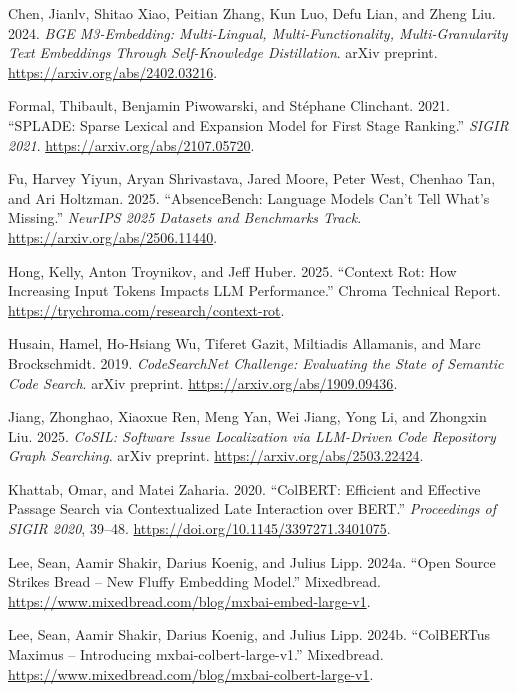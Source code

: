 \documentclass[
  11pt,
  letterpaper,
  numbers=noendperiod,
  parskip=half]{scrartcl}
\newlength{\cslhangindent}
\newenvironment{CSLReferences}[2] %
 {\begin{list}{}{%
  \setlength{\itemindent}{0pt}
  \setlength{\leftmargin}{0pt}
  \setlength{\parsep}{0pt}
  \ifodd #1
   \setlength{\leftmargin}{\cslhangindent}
   \setlength{\itemindent}{-1\cslhangindent}
  \fi
  \setlength{\itemsep}{#2\baselineskip}}}
 {\end{list}}
\begin{document}
\begin{CSLReferences}{1}{1}
Chen, Jianlv, Shitao Xiao, Peitian Zhang, Kun Luo, Defu Lian, and Zheng
Liu. 2024. \emph{{BGE M3}-Embedding: Multi-Lingual,
Multi-Functionality, Multi-Granularity Text Embeddings Through
Self-Knowledge Distillation}. arXiv preprint.
\url{https://arxiv.org/abs/2402.03216}.

Formal, Thibault, Benjamin Piwowarski, and Stéphane Clinchant. 2021.
{``{SPLADE}: Sparse Lexical and Expansion Model for First Stage
Ranking.''} \emph{SIGIR 2021}. \url{https://arxiv.org/abs/2107.05720}.

Fu, Harvey Yiyun, Aryan Shrivastava, Jared Moore, Peter West, Chenhao
Tan, and Ari Holtzman. 2025. {``AbsenceBench: Language Models Can't Tell
What's Missing.''} \emph{NeurIPS 2025 Datasets and Benchmarks Track}.
\url{https://arxiv.org/abs/2506.11440}.

Hong, Kelly, Anton Troynikov, and Jeff Huber. 2025. {``Context Rot: How
Increasing Input Tokens Impacts LLM Performance.''} Chroma Technical
Report. \url{https://trychroma.com/research/context-rot}.

Husain, Hamel, Ho-Hsiang Wu, Tiferet Gazit, Miltiadis Allamanis, and
Marc Brockschmidt. 2019. \emph{CodeSearchNet Challenge: Evaluating the
State of Semantic Code Search}. arXiv preprint.
\url{https://arxiv.org/abs/1909.09436}.

Jiang, Zhonghao, Xiaoxue Ren, Meng Yan, Wei Jiang, Yong Li, and Zhongxin
Liu. 2025. \emph{{CoSIL}: Software Issue Localization via LLM-Driven
Code Repository Graph Searching}. arXiv preprint.
\url{https://arxiv.org/abs/2503.22424}.

Khattab, Omar, and Matei Zaharia. 2020. {``{ColBERT}: Efficient and
Effective Passage Search via Contextualized Late Interaction over
BERT.''} \emph{Proceedings of SIGIR 2020}, 39--48.
\url{https://doi.org/10.1145/3397271.3401075}.

Lee, Sean, Aamir Shakir, Darius Koenig, and Julius Lipp. 2024a. {``Open
Source Strikes Bread -- New Fluffy Embedding Model.''} Mixedbread.
\url{https://www.mixedbread.com/blog/mxbai-embed-large-v1}.

Lee, Sean, Aamir Shakir, Darius Koenig, and Julius Lipp. 2024b.
{``ColBERTus Maximus -- Introducing mxbai-colbert-large-v1.''}
Mixedbread. \url{https://www.mixedbread.com/blog/mxbai-colbert-large-v1}.


\end{CSLReferences}
\end{document}
